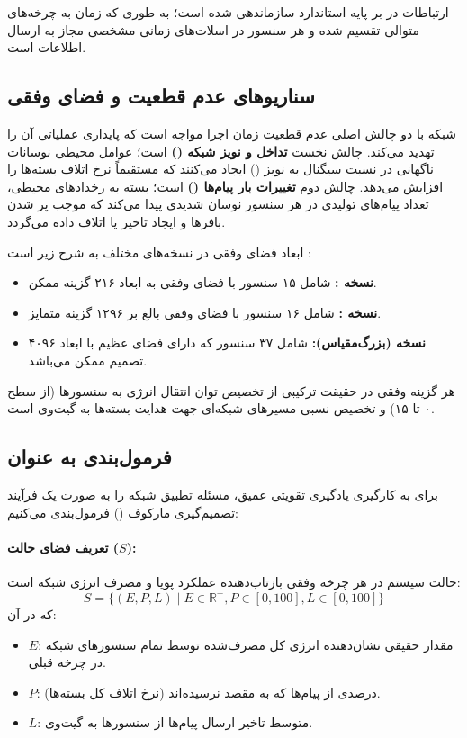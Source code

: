 \documentclass[oneside,openany,phd]{TMU-Thesis}
\begin{document}
ارتباطات در  بر پایه استاندارد  سازماندهی شده است؛ به طوری که زمان به چرخه‌های متوالی تقسیم شده و هر سنسور در اسلات‌های زمانی مشخصی مجاز به ارسال اطلاعات است.
\subsection{سناریوهای عدم قطعیت و فضای وفقی}

شبکه  با دو چالش اصلی عدم قطعیت زمان اجرا مواجه است که پایداری عملیاتی آن را تهدید می‌کند. چالش نخست \textbf{تداخل و نویز شبکه ()} است؛ عوامل محیطی نوسانات ناگهانی در نسبت سیگنال به نویز () ایجاد می‌کنند که مستقیماً نرخ اتلاف بسته‌ها را افزایش می‌دهد. چالش دوم \textbf{تغییرات بار پیام‌ها ()} است؛ بسته به رخدادهای محیطی، تعداد پیام‌های تولیدی در هر سنسور نوسان شدیدی پیدا می‌کند که موجب پر شدن بافرها و ایجاد تاخیر یا اتلاف داده می‌گردد.

ابعاد فضای وفقی در نسخه‌های مختلف  به شرح زیر است \cite{gerostathopoulos2019deltaiot}:
\begin{itemize}
    \item \textbf{نسخه :} شامل ۱۵ سنسور با فضای وفقی به ابعاد ۲۱۶ گزینه ممکن.
    \item \textbf{نسخه :} شامل ۱۶ سنسور با فضای وفقی بالغ بر ۱۲۹۶ گزینه متمایز.
    \item \textbf{نسخه  (بزرگ‌مقیاس):} شامل ۳۷ سنسور که دارای فضای عظیم با ابعاد ۴۰۹۶ تصمیم ممکن می‌باشد.
\end{itemize}

هر گزینه وفقی در حقیقت ترکیبی از تخصیص توان انتقال انرژی به سنسورها (از سطح ۰ تا ۱۵) و تخصیص نسبی مسیرهای شبکه‌ای جهت هدایت بسته‌ها به گیت‌وی است.

\subsection{فرمول‌بندی به عنوان }

برای به کارگیری یادگیری تقویتی عمیق، مسئله تطبیق شبکه  را به صورت یک فرآیند تصمیم‌گیری مارکوف () فرمول‌بندی می‌کنیم:

\paragraph{تعریف فضای حالت ($S$):}
حالت سیستم در هر چرخه وفقی بازتاب‌دهنده عملکرد پویا و مصرف انرژی شبکه است:
$$S = \{(E, P, L) \mid E \in \mathbb{R}^+, P \in [0, 100], L \in [0, 100]\}$$
که در آن:
\begin{itemize}
    \item $E$: مقدار حقیقی نشان‌دهنده انرژی کل مصرف‌شده توسط تمام سنسورهای شبکه در چرخه قبلی.
    \item $P$: درصدی از پیام‌ها که به مقصد نرسیده‌اند (نرخ اتلاف کل بسته‌ها).
    \item $L$: متوسط تاخیر ارسال پیام‌ها از سنسورها به گیت‌وی.
\end{itemize}
\end{document}
